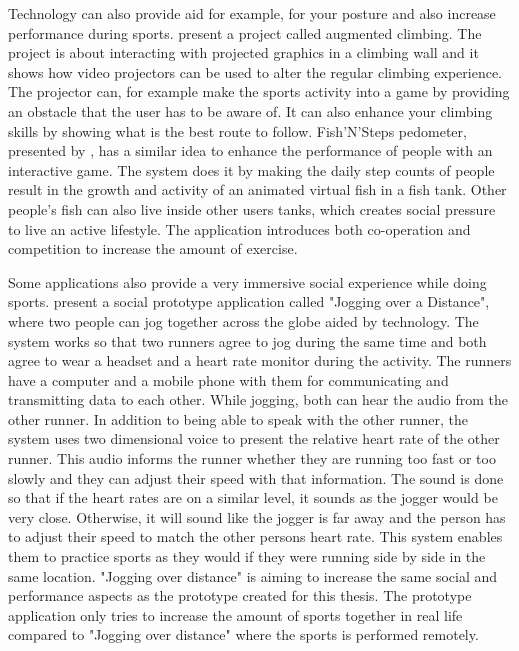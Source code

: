 Technology can also provide aid for example, for your posture and also increase performance during sports. \cite{augmentedClimbing} present a project called augmented climbing. The project is about interacting with projected graphics in a climbing wall and it shows how video projectors can be used to alter the regular climbing experience. The projector can, for example make the sports activity into a game by providing an obstacle that the user has to be aware of. It can also enhance your climbing skills by showing what is the best route to follow. Fish’N’Steps pedometer, presented by \cite{fishGame}, has a similar idea to enhance the performance of people with an interactive game. The system does it by making the daily step counts of people result in the growth and activity of an animated virtual fish in a fish tank. Other people's fish can also live inside other users tanks, which creates social pressure to live an active lifestyle. The application introduces both co-operation and competition to increase the amount of exercise.

Some applications also provide a very immersive social experience while doing sports.\cite{joggingOverDistance} present a social prototype application called "Jogging over a Distance", where two people can jog together across the globe aided by technology. The system works so that two runners agree to jog during the same time and both agree to wear a headset and a heart rate monitor during the activity. The runners have a computer and a mobile phone with them for communicating and transmitting data to each other. While jogging, both can hear the audio from the other runner. In addition to being able to speak with the other runner, the system uses two dimensional voice to present the relative heart rate of the other runner. This audio informs the runner whether they are running too fast or too slowly and they can adjust their speed with that information. The sound is done so that if the heart rates are on a similar level, it sounds as the jogger would be very close. Otherwise, it will sound like the jogger is far away and the person has to adjust their speed to match the other persons heart rate. This system enables them to practice sports as they would if they were running side by side in the same location. "Jogging over distance" is aiming to increase the same social and performance aspects as the prototype created for this thesis. The prototype application only tries to increase the amount of sports together in real life compared to "Jogging over distance" where the sports is performed remotely.

